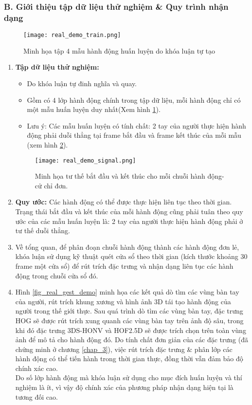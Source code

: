 \subsubsection{B. Giới thiệu tập dữ liệu thử nghiệm \& Quy trình nhận dạng}
\begin{figure}
\centering
\texttt{[image: real\_demo\_train.png]}
\caption{Minh họa tập 4 mẫu hành động huấn luyện do khóa luận tự tạo}
\label{fig_real_demo_train}
\end{figure}
\begin{enumerate}
	\item \textbf{Tập dữ liệu thử nghiệm: }
		\begin{itemize}
			\item Do khóa luận tự đinh nghĩa và quay. 
			\item Gồm có 4 lớp hành động chính trong tập dữ liệu, mỗi hành động chỉ có một mẫu huấn luyện duy nhất(Xem hình \ref{fig_real_demo_train}).
			\item Lưu ý: Các mẫu huấn luyện có tính chất: 2 tay của người thực hiện hành động phải duỗi thẳng tại frame bắt đầu và frame kết thúc của mỗi mẫu (xem hình \ref{fig_real_demo_signal}).
		\end{itemize}
	
\begin{figure}
\centering
\texttt{[image: real\_demo\_signal.png]}
\caption{Minh họa tư thế bắt đầu và kết thúc cho mỗi chuỗi hành động-cử chỉ đơn.}
\label{fig_real_demo_signal}
\end{figure}	
		\item \textbf{Quy ước:} Các hành động có thể được thực hiện liên tục theo thời gian. Trạng thái bắt đầu và kết thúc của mỗi hành động cũng phải tuân theo quy ước của các mẫu huấn luyện là: 2 tay của người thực hiện hành động phải ở tư thế duỗi thẳng.
		\item Về tổng quan, để phân đoạn chuỗi hành động thành các hành động đơn lẻ, khóa luận sử dụng kỹ thuật quét cửa sổ theo thời gian (kích thước khoảng 30 frame một cửa sổ) để rút trích đặc trưng và nhận dạng liên tục các hành động trong chuỗi cửa sổ đó.
		\item Hình \ref{fig_real_gest_demo} minh họa các kết quả dò tìm các vùng bàn tay của người, rút trích khung xương và hình ảnh 3D tái tạo hành động của người trong thế giới thực. Sau quá trình dò tìm các vùng bàn tay, đặc trưng HOG sẽ được rút trích xung quanh các vùng bàn tay trên ảnh độ sâu, trong khi đó đặc trưng 3DS-HONV và HOF2.5D sẽ được trích chọn trên toàn vùng ảnh để mô tả cho hành động đó. Do tính chất đơn giản của các đặc trưng (đã chứng minh ở chương \ref{chap_3}), việc rút trích đặc trưng \& phân lớp các hành động có thể tiến hành trong thời gian thực, đồng thời vẫn đảm bảo độ chính xác cao.\\
		Do số lớp hành động mà khóa luận sử dụng cho mục đích huấn luyện và thí nghiệm là ít, vì vậy độ chính xác của phương pháp nhận dạng hiện tại là tương đối cao.
\end{enumerate}

